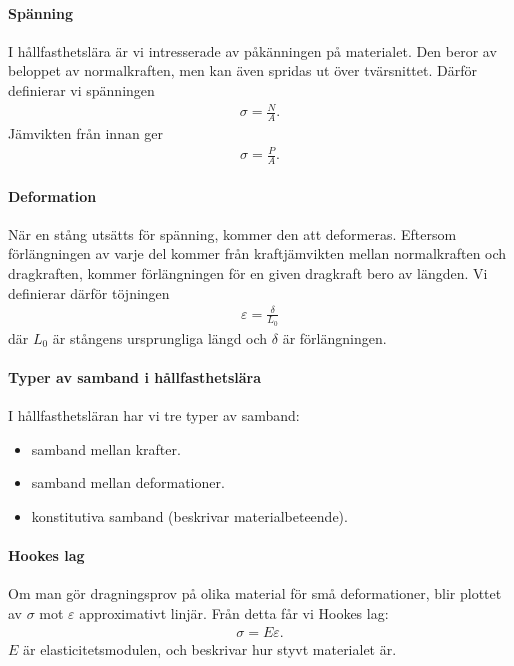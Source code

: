 \paragraph{Spänning}
I hållfasthetslära är vi intresserade av påkänningen på materialet. Den beror av beloppet av normalkraften, men kan även spridas ut över tvärsnittet. Därför definierar vi spänningen
\begin{align*}
	\sigma = \frac{N}{A}.
\end{align*}
Jämvikten från innan ger
\begin{align*}
	\sigma = \frac{P}{A}.
\end{align*}

\paragraph{Deformation}
När en stång utsätts för spänning, kommer den att deformeras. Eftersom förlängningen av varje del kommer från kraftjämvikten mellan normalkraften och dragkraften, kommer förlängningen för en given dragkraft bero av längden. Vi definierar därför töjningen
\begin{align*}
	\varepsilon	= \frac{\delta}{L_{0}}
\end{align*}
där $L_{0}$ är stångens ursprungliga längd och $\delta$ är förlängningen.

\paragraph{Typer av samband i hållfasthetslära}
I hållfasthetsläran har vi tre typer av samband:
\begin{itemize}
	\item samband mellan krafter.
	\item samband mellan deformationer.
	\item konstitutiva samband (beskrivar materialbeteende).
\end{itemize}

\paragraph{Hookes lag}
Om man gör dragningsprov på olika material för små deformationer, blir plottet av $\sigma$ mot $\varepsilon$ approximativt linjär. Från detta får vi Hookes lag:
\begin{align*}
	\sigma = E\varepsilon.
\end{align*}
$E$ är elasticitetsmodulen, och beskrivar hur styvt materialet är.

